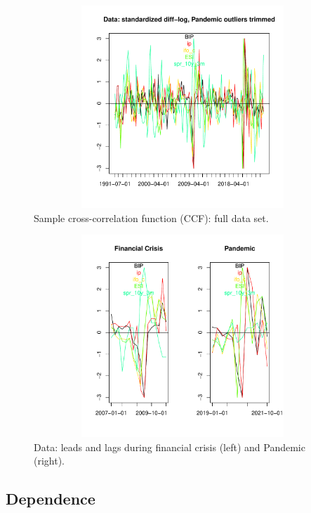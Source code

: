 \documentclass[a4paper]{article}
\begin{document}
\begin{figure}[H]\begin{center}\includegraphics[height=3in, width=4.5in]{./Figures/Data.pdf}\caption{Sample cross-correlation function (CCF): full data set.\label{data}}\end{center}\end{figure}
\begin{figure}[H]\begin{center}\includegraphics[height=3in, width=4.5in]{./Figures/data_lags.pdf}\caption{Data: leads and lags during financial crisis (left) and Pandemic (right).\label{data_lags}}\end{center}\end{figure}




\subsection{Dependence}
\end{document}
